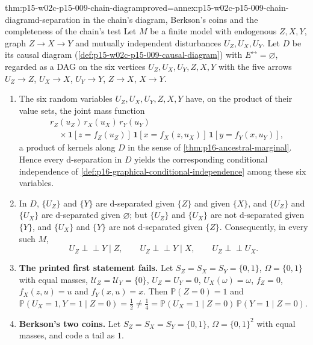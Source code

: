 \begin{hbtheorem}{thm:p15-w02c-p15-009-chain-diagram}{proved=annex:p15-w02c-p15-009-chain-diagram}{d-separation in the chain's diagram, Berkson's coins and the completeness of the chain's test}
Let \(M\) be a finite model with endogenous \(Z,X,Y\), graph
\(Z\to X\to Y\) and mutually independent disturbances
\(U_Z,U_X,U_Y\). Let \(D\) be its causal diagram
(\cref{def:p15-w02c-p15-009-causal-diagram}) with
\(E^{\leftrightarrow}=\varnothing\), regarded as a DAG on the six vertices
\(U_Z,U_X,U_Y,Z,X,Y\) with the five arrows \(U_Z\to Z\), \(U_X\to X\),
\(U_Y\to Y\), \(Z\to X\), \(X\to Y\).
\begin{enumerate}
\item The six random variables \(U_Z,U_X,U_Y,Z,X,Y\) have, on the
      product of their value sets, the joint mass function
      \[
      \begin{aligned}
       &r_Z(u_Z)\,r_X(u_X)\,r_Y(u_Y)\\
       &\quad\times\mathbf 1[z=f_Z(u_Z)]\,\mathbf 1[x=f_X(z,u_X)]\,
       \mathbf 1[y=f_Y(x,u_Y)],
      \end{aligned}
      \]
      a product of kernels along \(D\) in the sense of
      \cref{thm:p16-ancestral-marginal}. Hence every d-separation in
      \(D\) yields the corresponding conditional independence of
      \cref{def:p16-graphical-conditional-independence} among these six
      variables.
\item In \(D\), \(\{U_Z\}\) and \(\{Y\}\) are d-separated given
      \(\{Z\}\) and given \(\{X\}\), and \(\{U_Z\}\) and \(\{U_X\}\)
      are d-separated given \(\varnothing\); but \(\{U_Z\}\) and
      \(\{U_X\}\) are not d-separated given \(\{Y\}\), and \(\{U_X\}\)
      and \(\{Y\}\) are not d-separated given \(\{Z\}\). Consequently,
      in every such \(M\),
      \[
       U_Z\mathrel{\perp\!\!\!\perp}Y\mid Z,\qquad
       U_Z\mathrel{\perp\!\!\!\perp}Y\mid X,\qquad
       U_Z\mathrel{\perp\!\!\!\perp}U_X .
      \]
\item \textbf{The printed first statement fails.} Let
      \(S_Z=S_X=S_Y=\{0,1\}\), \(\Omega=\{0,1\}\) with equal masses,
      \(\mathcal U_Z=\mathcal U_Y=\{0\}\), \(U_Z=U_Y=0\),
      \(U_X(\omega)=\omega\), \(f_Z=0\), \(f_X(z,u)=u\) and
      \(f_Y(x,u)=x\). Then \(\mathbb P(Z=0)=1\) and
      \(\mathbb P(U_X=1,Y=1\mid Z=0)=\tfrac12\ne\tfrac14
      =\mathbb P(U_X=1\mid Z=0)\,\mathbb P(Y=1\mid Z=0)\).
\item \textbf{Berkson's two coins.} Let \(S_Z=S_X=S_Y=\{0,1\}\),
      \(\Omega=\{0,1\}^2\) with equal masses, and code a tail as \(1\).

\end{enumerate}
\end{hbtheorem}
